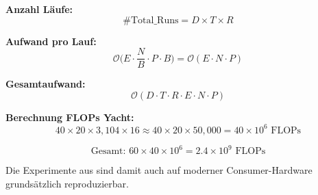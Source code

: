 \textbf{Anzahl Läufe:}
\[
\text{\#Total\_Runs} = D \times T \times R
\]

\textbf{Aufwand pro Lauf:}
\[
\mathcal{O}\biggl(E \cdot \frac{N}{B} \cdot P \cdot B \biggr) 
=
\mathcal{O}(E \cdot N \cdot P)
\]

\textbf{Gesamtaufwand:}
\[
\boxed{
\mathcal{O}\left( D \cdot T \cdot R \cdot E \cdot N \cdot P \right)
}
\]

\textbf{Berechnung FLOPs Yacht:}
\[
40 \times 20 \times 3{,}104 \times 16 
\approx 40 \times 20 \times 50,000 
= 40 \times 10^6 \text{ FLOPs}
\]

\[
\text{Gesamt: } 
60 \times 40 \times 10^6 
= 2.4 \times 10^9 \text{ FLOPs}
\]

\noindent
Die Experimente aus \parencite{amini2020deep} sind damit auch auf moderner Consumer-Hardware grundsätzlich reproduzierbar.
